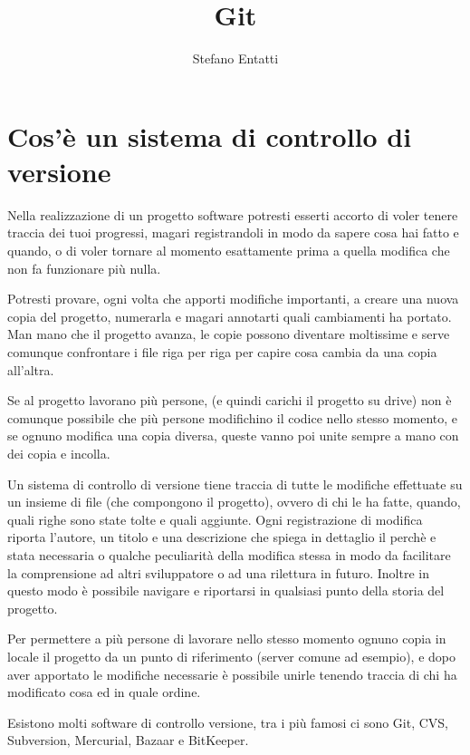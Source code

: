 \documentclass{article} \usepackage[textwidth=19cm,textheight=24cm]{geometry}
\title{Git} \date{\vspace{-5ex}} \author{Stefano Entatti}
\begin{document}
\maketitle

\newcommand{\code}[1]{\texttt{#1}}

\section{Cos'è un sistema di controllo di versione}

Nella realizzazione di un progetto software potresti esserti accorto di voler
tenere traccia dei tuoi progressi, magari registrandoli in modo da sapere cosa
hai fatto e quando, o di voler tornare al momento esattamente prima a quella
modifica che non fa funzionare più nulla.

Potresti provare, ogni volta che apporti modifiche importanti, a creare una
nuova copia del progetto, numerarla e magari annotarti quali cambiamenti ha
portato. Man mano che il progetto avanza, le copie possono diventare moltissime
e serve comunque confrontare i file riga per riga per capire cosa cambia da una
copia all'altra.

Se al progetto lavorano più persone, (e quindi carichi il progetto su drive) non
è comunque possibile che più persone modifichino il codice nello stesso momento,
e se ognuno modifica una copia diversa, queste vanno poi unite sempre a mano con
dei copia e incolla.

Un sistema di controllo di versione tiene traccia di tutte le modifiche
effettuate su un insieme di file (che compongono il progetto), ovvero di chi le
ha fatte, quando, quali righe sono state tolte e quali aggiunte. Ogni registrazione
di modifica riporta l'autore, un titolo e una descrizione che spiega in dettaglio
il perchè e stata necessaria o qualche peculiarità della modifica stessa
in modo da facilitare la comprensione ad altri sviluppatore o ad una rilettura
in futuro. Inoltre in questo modo è possibile navigare e riportarsi in 
qualsiasi punto della storia del progetto.

Per permettere a più persone di lavorare nello stesso momento ognuno
copia in locale il progetto da un punto di riferimento (server comune ad
esempio), e dopo aver apportato le modifiche necessarie è possibile unirle 
tenendo traccia di chi ha modificato cosa ed in quale ordine.

Esistono molti software di controllo versione, tra i più famosi ci sono Git,
CVS, Subversion, Mercurial, Bazaar e BitKeeper.
\end{document}
